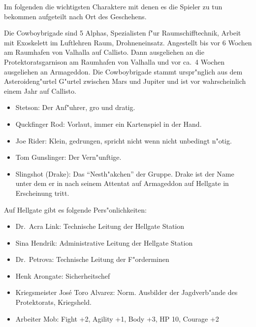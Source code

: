 
Im folgenden die wichtigsten Charaktere mit denen es die Spieler zu tun bekommen aufgeteilt nach Ort des Geschehens.


Die Cowboybrigade sind 5 Alphas, Spezialisten f"ur Raumschifftechnik, Arbeit mit Exoskelett im Luftlehren Raum, Drohneneinsatz.
Angestellt bis vor 6 Wochen am Raumhafen von Valhalla auf Callisto. Dann ausgeliehen an die Protektoratsgarnison am Raumhafen von Valhalla und vor ca.~4 Wochen ausgeliehen an Armageddon. Die Cowboybrigade stammt urspr"nglich aus dem Asteroideng"urtel G"urtel zwischen Mars und Jupiter und ist vor wahrscheinlich einem Jahr auf Callisto.

\begin{itemize}
    \item Stetson: Der Anf"uhrer, gro\3 und dratig.
    \item Quckfinger Rod: Vorlaut, immer ein Kartenspiel in der Hand.
    \item Joe Rider: Klein, gedrungen, spricht nicht wenn nicht unbedingt n"otig.
    \item Tom Gunslinger: Der Vern"unftige.
    \item Slingshot (Drake): Das "`Nesth"akchen"' der Gruppe. Drake ist der Name unter dem er in nach seinem Attentat 
    auf Armageddon auf Hellgate in Erscheinung tritt.
\end{itemize}

\newpage


Auf Hellgate gibt es folgende Pers"onlichkeiten: 

\begin{itemize}
    \item Dr.~Acra Link: Technische Leitung der Hellgate Station
    \item Sina Hendrik: Administrative Leitung der Hellgate Station
    \item Dr.~Petrova: Technische Leitung der F"orderminen
    \item Henk Arongate: Sicherheitschef    
    \item Kriegsmeister Jos\'{e} \frqq{}Toro\flqq{} Alvarez: Norm. Ausbilder der Jagdverb"ande des Protektorats, Kriegsheld.
    \item Arbeiter Mob: Fight +2, Agility +1, Body +3, HP 10, Courage +2
\end{itemize}


